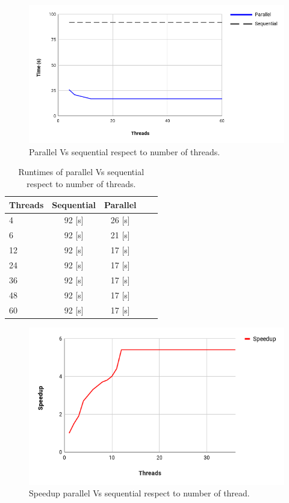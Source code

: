 \documentclass[10pt,twocolumn,letterpaper]{article}
\begin{document}
\begin{figure}[H]
\begin{center}
\includegraphics[width=\columnwidth]{template/latex/parVsseqTh.png}
\centering
\caption{Parallel Vs sequential respect to number of threads.}
\label{fig:short}
\end{center}
\end{figure}

\begin{table}[H]
\begin{center}
\begin{tabular}{|l|c|c|c|c|}
\hline
Threads & Sequential & Parallel\\
\hline\hline
4 & 92 [s] & 26 [s]\\
6 & 92 [s] & 21 [s]\\
12 & 92 [s] & 17 [s]\\
24 & 92 [s] & 17 [s]\\
36 & 92 [s] & 17 [s]\\
48 & 92 [s] & 17 [s]\\
60 & 92 [s] & 17 [s]\\
\hline
\end{tabular}
\end{center}
\caption{Runtimes of parallel Vs sequential respect to number of threads.}
\end{table}

\begin{figure}[H]
\begin{center}
\includegraphics[width=\columnwidth]{template/latex/speedupTh.png}
\caption{Speedup parallel Vs sequential respect to number of thread.}
\label{fig:short}
\end{center}
\end{figure}
\end{document}
